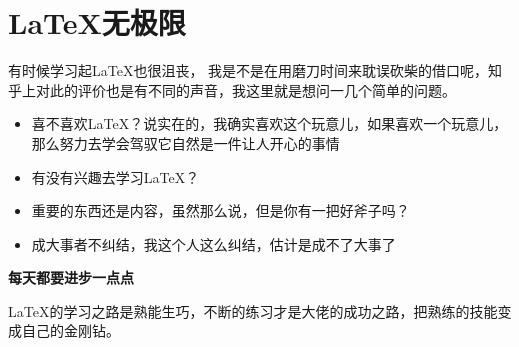 \chapter{\LaTeX 无极限}

有时候学习起\LaTeX 也很沮丧， 我是不是在用磨刀时间来耽误砍柴的借口呢，知乎上对此的评价也是有不同的声音，我这里就是想问一几个简单的问题。
\begin{itemize}
\item 喜不喜欢\LaTeX ？说实在的，我确实喜欢这个玩意儿，如果喜欢一个玩意儿，那么努力去学会驾驭它自然是一件让人开心的事情
\item 有没有兴趣去学习\LaTeX ？
\item 重要的东西还是内容，虽然那么说，但是你有一把好斧子吗？
\item 成大事者不纠结，我这个人这么纠结，估计是成不了大事了
\end{itemize}

\textbf{每天都要进步一点点}

\LaTeX 的学习之路是熟能生巧，不断的练习才是大佬的成功之路，把熟练的技能变成自己的金刚钻。